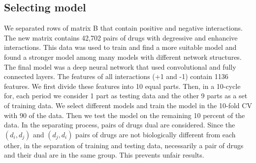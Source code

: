 \documentclass{bmcart}
\begin{document}
\subsection*{Selecting model\label{Selecting model}}
We separated rows of matrix B that contain positive and negative interactions. The new matrix contains 42,702 pairs of drugs with degressive and enhancive interactions. This data was used to train and find a more suitable model and found a stronger model among many models with different network structures. The final model was a deep neural network that used convolutional and fully connected layers. The features of all interactions (+1 and -1) contain 1136 features. We first divide these features into 10 equal parts. Then, in a 10-cycle for, each period we consider 1 part as testing data and the other 9 parts as a set of training data. We select different models and train the model in the 10-fold CV with 90  of the data. Then we test the model on the remaining 10 percent of the data. In the separating process, pairs of drugs dual are considered. Since the $ (d_i, d_j) $ and $ (d_j, d_i) $ pairs of drugs are not biologically different from each other, in the separation of training and testing data, necessarily a pair of drugs and their dual are in the same group. This prevents unfair results.
\end{document}
